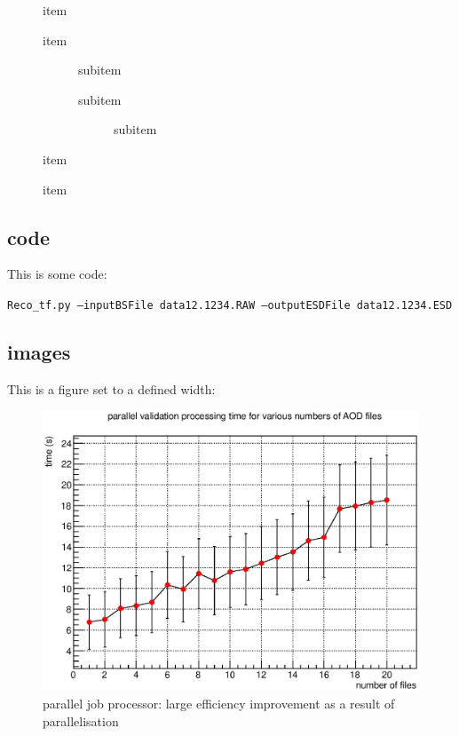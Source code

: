 \begin{description}
\item[\Checkmark] item
\item[\Checkmark] item
    \begin{description}
    \item[\Checkmark] subitem
    \item[\Checkmark] subitem
        \begin{description}
        \item[\Checkmark] subitem
        \end{description}
    \end{description}
\item[\Checkmark] item
\item[\XSolidBrush] item
\end{description}

\subsection{code}

This is some code:

\begin{center}
\footnotesize\texttt{Reco\_tf.py --inputBSFile data12.1234.RAW --outputESDFile data12.1234.ESD}
\end{center}

\subsection{images}

This is a figure set to a defined width:

\begin{figure}[H]
\begin{center}
\includegraphics[width=\measureUSpecification]{images/2014-04-10_1.eps}
\end{center}
\caption{parallel job processor: large efficiency improvement as a result of parallelisation}
\end{figure}

